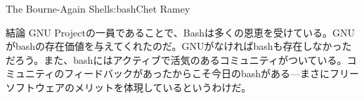 \begin{aosachapter}{The Bourne-Again Shell}{s:bash}{Chet Ramey}
\begin{aosasect1}{結論}
GNU Projectの一員であることで、Bashは多くの恩恵を受けている。GNUがbashの存在価値を与えてくれたのだ。GNUがなければbashも存在しなかっただろう。また、bashにはアクティブで活気のあるコミュニティがついている。コミュニティのフィードバックがあったからこそ今日のbashがある---まさにフリーソフトウェアのメリットを体現しているというわけだ。

\end{aosasect1}

\end{aosachapter}

